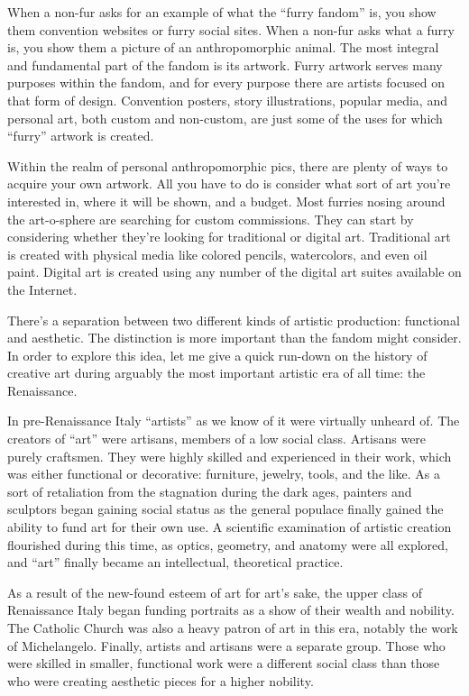 
When a non-fur asks for an example of what the ``furry fandom'' is, you show them convention websites or furry social sites. When a non-fur asks what a furry is, you show them a picture of an anthropomorphic animal. The most integral and fundamental part of the fandom is its artwork. Furry artwork serves many purposes within the fandom, and for every purpose there are artists focused on that form of design. Convention posters, story illustrations, popular media, and personal art, both custom and non-custom, are just some of the uses for which ``furry'' artwork is created.

Within the realm of personal anthropomorphic pics, there are plenty of ways to acquire your own artwork.  All you have to do is consider what sort of art you're interested in, where it will be shown, and a budget. Most furries nosing around the art-o-sphere are searching for custom commissions. They can start by considering whether they're looking for traditional or digital art. Traditional art is created with physical media like colored pencils, watercolors, and even oil paint. Digital art is created using any number of the digital art suites available on the Internet.

There's a separation between two different kinds of artistic production: functional and aesthetic. The distinction is more important than the fandom might consider. In order to explore this idea, let me give a quick run-down on the history of creative art during arguably the most important artistic era of all time: the Renaissance.

In pre-Renaissance Italy ``artists'' as we know of it were virtually unheard of. The creators of ``art'' were artisans, members of a low social class. Artisans were purely craftsmen. They were highly skilled and experienced in their work, which was either functional or decorative: furniture, jewelry, tools, and the like. As a sort of retaliation from the stagnation during the dark ages, painters and sculptors began gaining social status as the general populace finally gained the ability to fund art for their own use. A scientific examination of artistic creation flourished during this time, as optics, geometry, and anatomy were all explored, and ``art'' finally became an intellectual, theoretical practice.

As a result of the new-found esteem of art for art's sake, the upper class of Renaissance Italy began funding portraits as a show of their wealth and nobility. The Catholic Church was also a heavy patron of art in this era, notably the work of Michelangelo. Finally, artists and artisans were a separate group. Those who were skilled in smaller, functional work were a different social class than those who were creating aesthetic pieces for a higher nobility.

